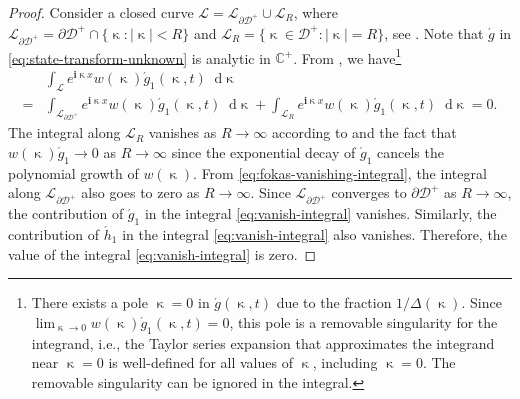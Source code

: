 \documentclass[journal,twoside,web]{ieeecolor}
\newcommand{\CC}{\mathbb{C}}
\newcommand{\D}{\mathcal{D}}
\newcommand{\im}{\mathbf{i}}
\newcommand*\diff{\mathop{}\!\mathrm{d}}
\newcommand{\kcomplex}{\upkappa}
\begin{document}
\begin{proof}
Consider a closed curve $\mathcal{L} = \mathcal{L}_{\partial \D^+}\cup\mathcal{L}_{R}$, where $\mathcal{L}_{\partial\D^+} = \partial\D^+\cap\{\kcomplex:|\kcomplex|<R\}$ and $\mathcal{L}_R=\{\kcomplex\in\D^+:|\kcomplex|=R\}$, see . 
Note that $\acute{g}$ in \eqref{eq:state-transform-unknown} is analytic in $\CC^+$.
From , we have\footnote{There exists a pole $\kcomplex=0$ in $\acute{g}(\kcomplex,t)$ due to the fraction $1/\Delta(\kcomplex)$. 
Since $\lim_{\kcomplex\to0}w(\kcomplex)\acute{g}_1(\kcomplex,t)=0$, this pole is a removable singularity for the integrand, i.e., the Taylor series expansion that approximates the integrand near $\kcomplex=0$ is well-defined for all values of $\kcomplex$, including $\kcomplex=0$. The removable singularity can be ignored in the integral.}
\begin{equation}\label{eq:fokas-vanishing-integral}
	\begin{aligned}
		&\int_{\mathcal{L}} e^{\im \kcomplex x}w(\kcomplex)\acute{g}_1(\kcomplex,t) \diff \kcomplex\\
		= &\int_{\mathcal{L}_{\partial\D^+}}\!\!\! e^{\im \kcomplex x}w(\kcomplex)\acute{g}_1(\kcomplex,t) \diff \kcomplex  + \int_{\mathcal{L}_R}\!\!e^{\im \kcomplex x}w(\kcomplex)\acute{g}_1(\kcomplex,t) \diff \kcomplex = 0.
	\end{aligned}
\end{equation}
The integral along $\mathcal{L}_R$ vanishes as $R\to\infty$ according to  and the fact that $w(\kcomplex)\acute{g}_1\to0$ as $R\to\infty$ since the exponential decay of $\acute{g}_1$ cancels the polynomial growth of $w(\kcomplex)$. 
From \eqref{eq:fokas-vanishing-integral}, the integral along $\mathcal{L}_{\partial\D^+}$ also goes to zero as $R\to\infty$. 
Since $\mathcal{L}_{\partial\D^+}$ converges to $\partial\D^+$ as $R\to\infty$, the contribution of $\acute{g}_1$ in the integral \eqref{eq:vanish-integral} vanishes. 
Similarly, the contribution of $\acute{h}_1$ in the integral \eqref{eq:vanish-integral} also vanishes. 
Therefore, the value of the integral \eqref{eq:vanish-integral} is zero. 
\end{proof}
\end{document}

